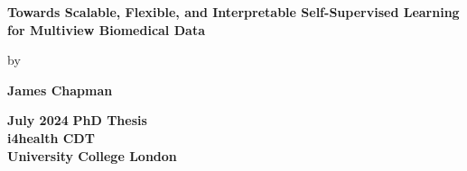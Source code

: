 \documentclass{report} %
\author{James Chapman}
\numberwithin{figure}{chapter}
\numberwithin{table}{section}
\begin{document}
\begin{titlepage}
    \centering
    {\LARGE\textbf{Towards Scalable, Flexible, and Interpretable Self-Supervised Learning for Multiview Biomedical Data}}
    \vspace{0.8cm}

    by

    \vspace{0.8cm}

    {\LARGE\textbf{James Chapman}}

    \vspace{1.5cm}

    {\LARGE\textbf{July 2024}}
    \vfill
    \textbf{
        PhD Thesis\\
        \vspace{1cm}
        i4health CDT\\
        University College London}
    \vspace{2cm}
\end{titlepage}

\onehalfspacing

\newpage



\newpage

\newpage
\dominitoc  %
\tableofcontents  %
\setcounter{tocdepth}{2}

\newpage
\listoffigures  %
\newpage
\listoftables  %

\newpage
\printglossary[type=\acronymtype, title=Acronyms]  %
\newpage
\printglossary[type=symbols, title=Symbols List]  %
\glsaddallunused[symbols]
\newpage
\printglossary[type=main, title=Definitions]  %
\glsaddallunused[main]
\end{document}
